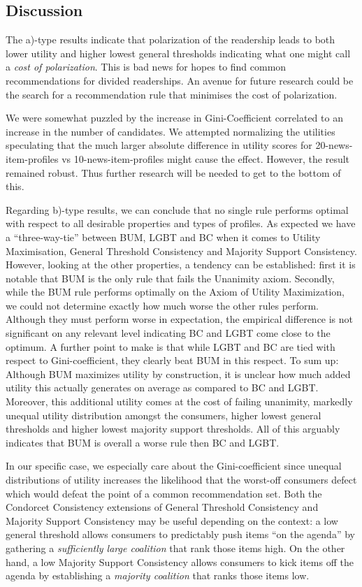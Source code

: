 \documentclass{article}
\begin{document}
\subsection{Discussion}

The a)-type results indicate that polarization of the readership leads to both lower utility and higher lowest general thresholds indicating what one might call a \emph{cost of polarization}. This is bad news for hopes to find common recommendations for divided readerships. An avenue for future research could be the search for a recommendation rule that minimises the cost of polarization.

We were somewhat puzzled by the increase in Gini-Coefficient correlated to an increase in the number of candidates. We attempted normalizing the utilities speculating that the much larger absolute difference in utility scores for 20-news-item-profiles vs  10-news-item-profiles might cause the effect. However, the result remained robust. Thus further research will be needed to get to the bottom of this.

Regarding b)-type results, we can conclude that no single rule performs optimal with respect to all desirable properties and types of profiles. As expected we have a ``three-way-tie'' between BUM, LGBT and BC when it comes to Utility Maximisation, General Threshold Consistency and Majority Support Consistency. However, looking at the other properties, a tendency can be established:
first it is notable that BUM is the only rule that fails the Unanimity axiom. Secondly, while the BUM rule performs optimally on the Axiom of Utility Maximization, we could not determine exactly how much worse the other rules perform. Although they must perform worse in expectation, the empirical difference is not significant on any relevant level indicating BC and LGBT come close to the optimum. A further point to make is that while LGBT and BC are tied with respect to Gini-coefficient, they clearly beat  BUM in this respect. To sum up: Although BUM maximizes utility by construction, it is unclear how much added utility this actually generates on average as compared to BC and LGBT. Moreover, this additional utility comes at the cost of failing unanimity, markedly unequal utility distribution amongst the consumers, higher lowest general thresholds and higher lowest majority support thresholds. All of this arguably indicates that BUM is overall a worse rule then BC and LGBT.

In our specific case, we especially care about the Gini-coefficient since unequal distributions of utility increases the likelihood that the worst-off consumers defect which would defeat the point of a common recommendation set. Both the Condorcet Consistency extensions of General Threshold Consistency and  Majority Support Consistency may be useful depending on the context: a low general threshold allows consumers to predictably push items ``on the agenda'' by gathering a \emph{sufficiently large coalition} that rank those items high. On the other hand, a low Majority Support Consistency allows consumers to kick items off the agenda by establishing a \emph {majority coalition} that ranks those items low.
\end{document}
